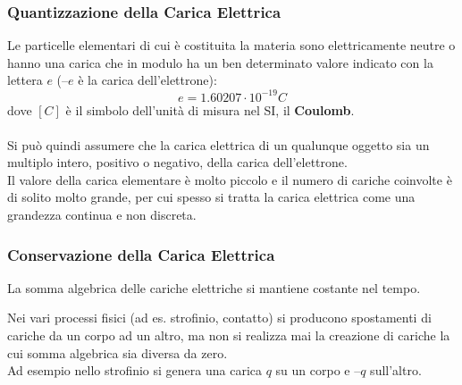 \documentclass[../main.tex]{subfiles}
\begin{document}
	\subsubsection{Quantizzazione della Carica Elettrica}
	Le particelle elementari di cui è costituita la materia sono elettricamente neutre o hanno una carica che in modulo ha un ben
	determinato valore indicato con la lettera $e$ (–$e$ è la carica dell'elettrone):
	\begin{equation}
		e = 1.60207 \cdot 10^{-19} C
	\end{equation}
	dove $\left[ C \right]$ è il simbolo dell'unità di misura nel SI, il \textbf{Coulomb}.\\\\
	Si può quindi assumere che la carica elettrica di un qualunque oggetto sia un multiplo intero, positivo o negativo, della carica
	dell'elettrone.\\
	Il valore della carica elementare è molto piccolo e il numero di cariche coinvolte è di solito molto grande, per cui spesso si tratta la carica elettrica come una grandezza continua e non discreta.
	\subsubsection{Conservazione della Carica Elettrica}
	\begin{definition}
		La somma algebrica delle cariche elettriche si mantiene costante nel tempo.
	\end{definition}
	Nei vari processi fisici (ad es. strofinio, contatto) si producono spostamenti di cariche da un corpo ad un altro, ma non si realizza mai la creazione di cariche la cui somma algebrica sia diversa da zero.\\
	Ad esempio nello strofinio si genera una carica $q$ su un corpo e –$q$ sull’altro.
\end{document}
